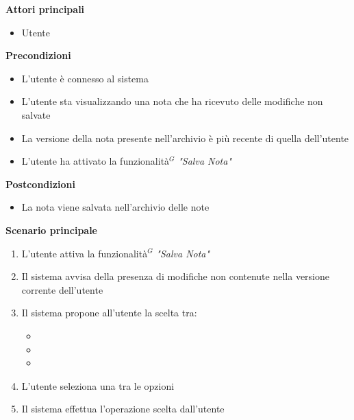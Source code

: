 \documentclass[a4paper,10pt]{article}
\begin{document}
    \textbf{Attori principali}
    \begin{itemize}
        \item Utente
    \end{itemize}
    \textbf{Precondizioni}
    \begin{itemize}
        \item L'utente è connesso al sistema
        \item L'utente sta visualizzando una nota che ha ricevuto delle modifiche non salvate
        \item La versione della nota presente nell'archivio è più recente di quella dell'utente
        \item L'utente ha attivato la funzionalità$^G$ \textit{"Salva Nota"}
    \end{itemize}
    \textbf{Postcondizioni}
    \begin{itemize}
        \item La nota viene salvata nell'archivio delle note
    \end{itemize}
    \textbf{Scenario principale}
    \begin{enumerate}
        \item L'utente attiva la funzionalità$^G$ \textit{"Salva Nota"}
        \item Il sistema avvisa della presenza di modifiche non contenute nella versione corrente dell'utente
        \item Il sistema propone all'utente la scelta tra:
            \begin{itemize}
                \item {}
                \item {}
                \item {}
            \end{itemize}
        \item L'utente seleziona una tra le opzioni
        \item Il sistema effettua l'operazione scelta dall'utente
    \end{enumerate}
\end{document}
